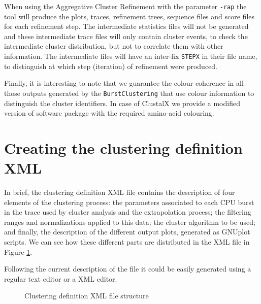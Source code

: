 \documentclass[a4paper, 12pt]{article}
\begin{document}
When using the Aggregative Cluster Refinement with the parameter \texttt{-rap}
the tool will produce the plots, traces, refinement trees, sequence files
and score files for each refinement step. The intermediate statistics files
will not be generated and these intermediate trace files will only contain
cluster events, to check the intermediate cluster distribution, but not to
correlate them with other information. The intermediate files will have an
inter-fix \texttt{STEPX} in their file name, to distinguish at which step
(iteration) of refinement were produced.

Finally, it is interesting to note that we guarantee the colour coherence
in all those outputs generated by the \texttt{BurstClustering} that use colour 
information to distinguish the cluster identifiers. In case of ClustalX we 
provide a modified version of software package with the required amino-acid
colouring.


\section{Creating the clustering definition XML}
\label{sec:xml_definition}

In brief, the clustering definition XML file contains the description of four
elements of the clustering process: the parameters associated to each CPU burst
in the trace used by cluster analysis and the extrapolation process; the
filtering ranges and normalizations applied to this data; the cluster 
algorithm to be used; and finally, the description of the different output
plots, generated as GNUplot scripts. We can see how these different parts are
distributed in the XML file in Figure \ref{fig:xml_structure}.

Following the current description of the file it could be easily generated
using a regular text editor or a XML editor.



\begin{figure}
  \centering
  
  
  \caption{Clustering definition XML file structure}
  \label{fig:xml_structure}
  
\end{figure}
\end{document}
